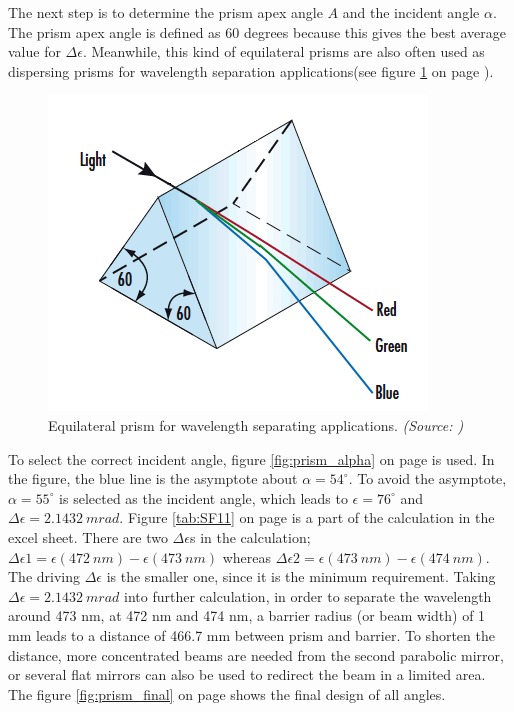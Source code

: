 The next step is to determine the prism apex angle $A$ and the incident angle $\alpha$. The prism apex angle is defined as 60 degrees because this gives the best average value for $\Delta\epsilon$. Meanwhile, this kind of equilateral prisms are also often used as dispersing prisms for wavelength separation applications(see figure \ref{fig:prism_equilateral} on page \pageref{fig:prism_equilateral}). 

\begin{figure}[ht!]
\centering
\includegraphics[scale = 0.8]{chapters/img/prism_equilateral.png}
\caption{Equilateral prism for wavelength separating applications. \emph{(Source: \cite{prism_material})}}
\label{fig:prism_equilateral}
\end{figure}

To select the correct incident angle, figure \ref{fig:prism_alpha} on page \pageref{fig:prism_alpha} is used. In the figure, the blue line is the asymptote about $\alpha = 54^\circ$. To avoid the asymptote, $\alpha = 55^\circ$ is selected as the incident angle, which leads to $\epsilon = 76^\circ$ and $\Delta\epsilon = 2.1432\ mrad$. Figure \ref{tab:SF11} on page \pageref{tab:SF11} is a part of the calculation in the excel sheet. There are two $\Delta\epsilon$s in the calculation; $\Delta\epsilon1 = \epsilon(472\ nm) - \epsilon(473\ nm)$ whereas $\Delta\epsilon2 = \epsilon(473\ nm) - \epsilon(474\ nm)$. The driving $\Delta\epsilon$ is the smaller one, since it is the minimum requirement. Taking $\Delta\epsilon = 2.1432\ mrad$ into further calculation, in order to separate the wavelength around 473 nm, at 472 nm and 474 nm, a barrier radius (or beam width) of 1 mm leads to a distance of 466.7 mm between prism and barrier. To shorten the distance, more concentrated beams are needed from the second parabolic mirror, or several flat mirrors can also be used to redirect the beam in a limited area. The figure \ref{fig:prism_final} on page \pageref{fig:prism_final} shows the final design of all angles.

